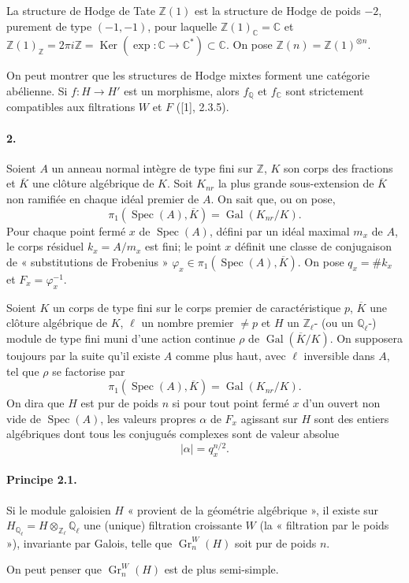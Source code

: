 \documentclass[10pt]{article}
\newcommand{\C}{\mathbb C}
\newcommand{\Q}{\mathbb Q}
\newcommand{\Z}{\mathbb Z}
\newcommand{\Ql}{\mathbb Q_\ell}
\newcommand{\Zl}{\mathbb Z_\ell}
\newcommand{\Gr}{\operatorname{Gr}}
\newcommand{\Gal}{\operatorname{Gal}}
\newcommand{\Spec}{\operatorname{Spec}}
\newcommand{\Ker}{\operatorname{Ker}}
\newcommand{\barK}{\overline{K}}
\begin{document}
La structure de Hodge de Tate $\Z(1)$ est la structure de Hodge de poids $-2$, purement de type $(-1,-1)$, pour laquelle $\Z(1)_\C=\C$ et $\Z(1)_\Z=2\pi i\Z=\Ker(\exp:\C\to\C^*)\subset\C$. On pose $\Z(n)=\Z(1)^{\otimes n}$.

On peut montrer que les structures de Hodge mixtes forment une catégorie abélienne. Si $f:H\to H'$ est un morphisme, alors $f_\Q$ et $f_\C$ sont strictement compatibles aux filtrations $W$ et $F$ ([1], 2.3.5).

\paragraph{2.} Soient $A$ un anneau normal intègre de type fini sur $\Z$, $K$ son corps des fractions et $\barK$ une clôture algébrique de $K$. Soit $K_{nr}$ la plus grande sous-extension de $\barK$ non ramifiée en chaque idéal premier de $A$. On sait que, ou on pose,
\[
\pi_1(\Spec(A),\barK)=\Gal(K_{nr}/K).
\]
Pour chaque point fermé $x$ de $\Spec(A)$, défini par un idéal maximal $m_x$ de $A$, le corps résiduel $k_x=A/m_x$ est fini; le point $x$ définit une classe de conjugaison de « substitutions de Frobenius » $\varphi_x\in\pi_1(\Spec(A),\barK)$. On pose $q_x=\#k_x$ et $F_x=\varphi_x^{-1}$.

Soient $K$ un corps de type fini sur le corps premier de caractéristique $p$, $\barK$ une clôture algébrique de $K$, $\ell$ un nombre premier $\ne p$ et $H$ un $\Zl$- (ou un $\Ql$-) module de type fini muni d'une action continue $\rho$ de $\Gal(\barK/K)$. On supposera toujours par la suite qu'il existe $A$ comme plus haut, avec $\ell$ inversible dans $A$, tel que $\rho$ se factorise par
\[
\pi_1(\Spec(A),\barK)=\Gal(K_{nr}/K).
\]
On dira que $H$ est pur de poids $n$ si pour tout point fermé $x$ d'un ouvert non vide de $\Spec(A)$, les valeurs propres $\alpha$ de $F_x$ agissant sur $H$ sont des entiers algébriques dont tous les conjugués complexes sont de valeur absolue
\[
|\alpha|=q_x^{n/2}.
\]

\paragraph{Principe 2.1.} Si le module galoisien $H$ « provient de la géométrie algébrique », il existe sur $H_{\Ql}=H\otimes_{\Zl}\Ql$ une (unique) filtration croissante $W$ (la « filtration par le poids »), invariante par Galois, telle que $\Gr_n^W(H)$ soit pur de poids $n$.

On peut penser que $\Gr_n^W(H)$ est de plus semi-simple.
\end{document}
